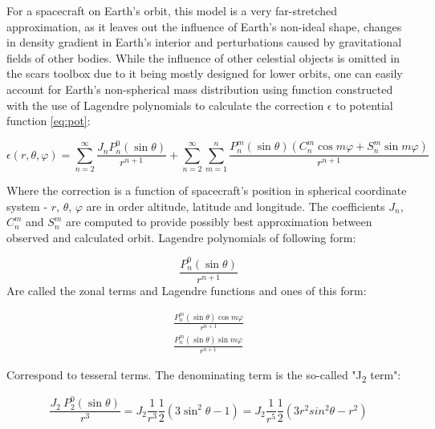         For a spacecraft on Earth's orbit, this model is a very far-stretched approximation, as it leaves out the influence of Earth's non-ideal shape, changes in density gradient in Earth's interior and perturbations caused by gravitational fields of other bodies. While the influence of other celestial objects is omitted in the \ac{scars} toolbox due to it being mostly designed for lower orbits, one can easily account for Earth's non-spherical mass distribution using function constructed with the use of Lagendre polynomials to calculate the correction $\epsilon$ to potential function \eqref{eq:pot}:

        \begin{equation}
            \epsilon(r, \theta, \varphi) = \sum_{n=2}^{\infty}  \frac{J_n P^0_n(\sin\theta) }{r^{n+1}} + \sum_{n=2}^{\infty} \sum_{m=1}^n \frac{ P^m_n(\sin\theta) (C_n^m \cos m\varphi + S_n^m \sin m\varphi)}{r^{n+1}}\label{eq:geopot}
        \end{equation}

        Where the correction is a function of spacecraft's position in spherical coordinate system - $r$, $\theta$, $\varphi$ are in order altitude, latitude and longitude. The coefficients $J_n$, $C_n^m$ and $S_n^m$ are computed to provide possibly best approximation between observed and calculated orbit. Lagendre polynomials of following form:

        \begin{equation}
            \frac{P^0_n(\sin\theta) }{r^{n+1}}    
        \end{equation}
        Are called the zonal terms and Lagendre functions and ones of this form: 
        
        \begin{equation}
        \begin{aligned}
            \frac{ P^m_n(\sin\theta) \cos m\varphi}{r^{n+1}}\\
            \frac{ P^m_n(\sin\theta) \sin m\varphi}{r^{n+1}}
        \end{aligned}
        \end{equation}
        
        Correspond to tesseral terms. The denominating term is the so-called "J\textsubscript{2} term":

        \begin{equation}
            \frac{J_2\ P^0_2(\sin\theta)}{r^3} = J_2 \frac{1}{r^3} \frac{1}{2} (3\sin^2\theta -1) = J_2 \frac{1}{r^5} \frac{1}{2} (3 r^2sin^2\theta -r^2)
        \end{equation}

